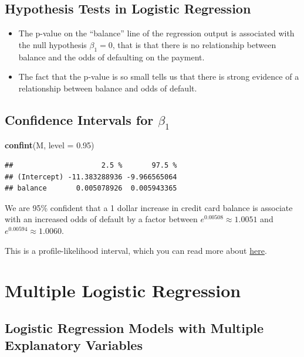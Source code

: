 \documentclass[]{book}
\newenvironment{Shaded}{\begin{snugshade}}{\end{snugshade}}
\newcommand{\KeywordTok}[1]{\textcolor[rgb]{0.13,0.29,0.53}{\textbf{#1}}}
\newcommand{\DataTypeTok}[1]{\textcolor[rgb]{0.13,0.29,0.53}{#1}}
\newcommand{\FloatTok}[1]{\textcolor[rgb]{0.00,0.00,0.81}{#1}}
\newcommand{\NormalTok}[1]{#1}
\begin{document}
\subsection{Hypothesis Tests in Logistic
Regression}\label{hypothesis-tests-in-logistic-regression}

\begin{itemize}
\item
  The p-value on the ``balance'' line of the regression output is
  associated with the null hypothesis \(\beta_1=0\), that is that there
  is no relationship between balance and the odds of defaulting on the
  payment.
\item
  The fact that the p-value is so small tells us that there is strong
  evidence of a relationship between balance and odds of default.
\end{itemize}

\subsection{\texorpdfstring{Confidence Intervals for
\(\beta_1\)}{Confidence Intervals for \textbackslash{}beta\_1}}\label{confidence-intervals-for-beta_1}

\begin{Shaded}
\begin{Highlighting}[]
\KeywordTok{confint}\NormalTok{(M, }\DataTypeTok{level =} \FloatTok{0.95}\NormalTok{)}
\end{Highlighting}
\end{Shaded}

\begin{verbatim}
##                     2.5 %       97.5 %
## (Intercept) -11.383288936 -9.966565064
## balance       0.005078926  0.005943365
\end{verbatim}

We are 95\% confident that a 1 dollar increase in credit card balance is
associate with an increased odds of default by a factor between
\(e^{0.00508}\approx 1.0051\) and \(e^{0.00594}\approx 1.0060\).

This is a profile-likelihood interval, which you can read more about
\href{https://rpubs.com/FJRubio/PLCIN}{here}.

\section{Multiple Logistic
Regression}\label{multiple-logistic-regression}

\subsection{Logistic Regression Models with Multiple Explanatory
Variables}\label{logistic-regression-models-with-multiple-explanatory-variables}
\end{document}
